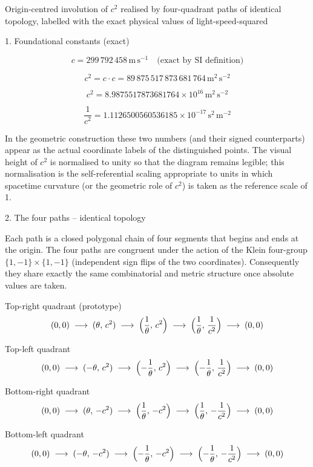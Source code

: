 Origin-centred involution of \(c^{2}\) realised by four-quadrant paths of identical topology, labelled with the exact physical values of light-speed-squared

1. Foundational constants (exact)

\[
c = 299\,792\,458\,\mathrm{m\,s^{-1}} \quad\text{(exact by SI definition)}
\]

\[
c^{2} = c\cdot c = 89\,875\,517\,873\,681\,764\,\mathrm{m^{2}\,s^{-2}}
\]

\[
c^{2} = 8.9875517873681764\times 10^{16}\,\mathrm{m^{2}\,s^{-2}}
\]

\[
\frac{1}{c^{2}} = 1.1126500560536185\times 10^{-17}\,\mathrm{s^{2}\,m^{-2}}
\]

In the geometric construction these two numbers (and their signed counterparts) appear as the actual coordinate labels of the distinguished points. The visual height of \(c^{2}\) is normalised to unity so that the diagram remains legible; this normalisation is the self-referential scaling appropriate to units in which spacetime curvature (or the geometric role of \(c^{2}\)) is taken as the reference scale of 1.

2. The four paths – identical topology

Each path is a closed polygonal chain of four segments that begins and ends at the origin. The four paths are congruent under the action of the Klein four-group \(\{1,-1\}\times\{1,-1\}\) (independent sign flips of the two coordinates). Consequently they share exactly the same combinatorial and metric structure once absolute values are taken.

Top-right quadrant (prototype)  
\[
(0,0)
\;\longrightarrow\;
(\theta,\,c^{2})
\;\longrightarrow\;
\Bigl(\frac1\theta,\,c^{2}\Bigr)
\;\longrightarrow\;
\Bigl(\frac1\theta,\,\frac1{c^{2}}\Bigr)
\;\longrightarrow\;
(0,0)
\]

Top-left quadrant  
\[
(0,0)
\;\longrightarrow\;
(-\theta,\,c^{2})
\;\longrightarrow\;
\Bigl(-\frac1\theta,\,c^{2}\Bigr)
\;\longrightarrow\;
\Bigl(-\frac1\theta,\,\frac1{c^{2}}\Bigr)
\;\longrightarrow\;
(0,0)
\]

Bottom-right quadrant  
\[
(0,0)
\;\longrightarrow\;
(\theta,\,-c^{2})
\;\longrightarrow\;
\Bigl(\frac1\theta,\,-c^{2}\Bigr)
\;\longrightarrow\;
\Bigl(\frac1\theta,\,-\frac1{c^{2}}\Bigr)
\;\longrightarrow\;
(0,0)
\]

Bottom-left quadrant  
\[
(0,0)
\;\longrightarrow\;
(-\theta,\,-c^{2})
\;\longrightarrow\;
\Bigl(-\frac1\theta,\,-c^{2}\Bigr)
\;\longrightarrow\;
\Bigl(-\frac1\theta,\,-\frac1{c^{2}}\Bigr)
\;\longrightarrow\;
(0,0)
\]

